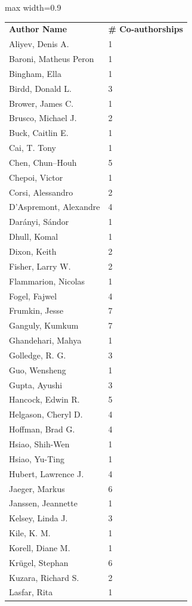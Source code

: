 \documentclass[a4paper,11pt, reqno]{amsart}
\begin{document}
{\centering\begin{adjustbox}{max width=0.9\textwidth}
\begin{tabular}{l l}
 {\bf Author Name} & {\bf \# Co-authorships} \\
Aliyev, Denis A. & 1 \\
Baroni, Matheus Peron & 1 \\
Bingham, Ella & 1 \\
Birdd, Donald L. & 3 \\
Brower, James C. & 1 \\
Brusco, Michael J. & 2 \\
Buck, Caitlin E. & 1 \\
Cai, T. Tony & 1 \\
Chen, Chun--Houh & 5 \\
Chepoi, Victor & 1 \\
Corsi, Alessandro & 2 \\
D'Aspremont, Alexandre & 4 \\
Darányi, Sándor & 1 \\
Dhull, Komal & 1 \\
Dixon, Keith & 2 \\
Fisher, Larry W. & 2 \\
Flammarion, Nicolas & 1 \\
Fogel, Fajwel & 4 \\
Frumkin, Jesse & 7 \\
Ganguly, Kumkum & 7 \\
Ghandehari, Mahya & 1 \\
Golledge, R. G. & 3 \\
Guo, Wensheng & 1 \\
Gupta, Ayushi & 3 \\
Hancock, Edwin R. & 5 \\
Helgason, Cheryl D. & 4 \\
Hoffman, Brad G. & 4 \\
Hsiao, Shih-Wen & 1 \\
Hsiao, Yu-Ting & 1 \\
Hubert, Lawrence J. & 4 \\
Jaeger, Markus & 6 \\
Janssen, Jeannette & 1 \\
Kelsey, Linda J. & 3 \\
Kile, K. M. & 1 \\
Korell, Diane M. & 1 \\
Kr\"ugel, Stephan & 6 \\
Kuzara, Richard S. & 2 \\
Lasfar, Rita & 1 \\

\end{tabular}
\end{adjustbox}}
\end{document}
